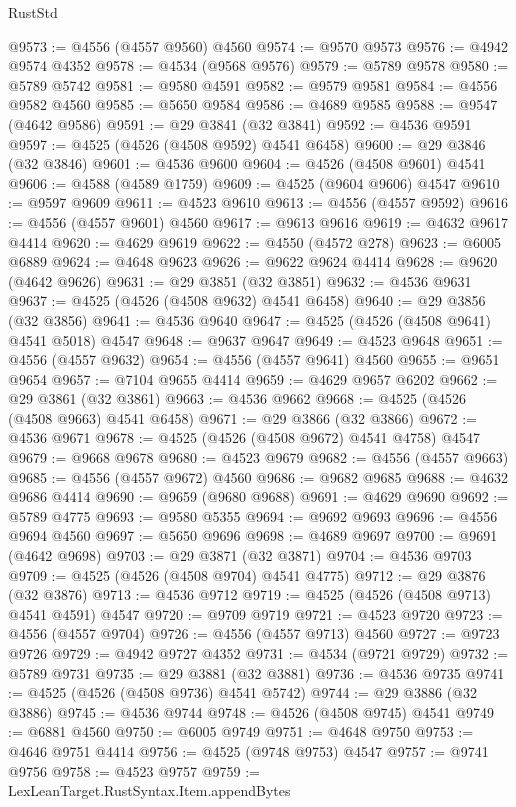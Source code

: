 \begin{lexlean}{RustStd}
\begin{coremodule}
{\begin{coremodule}
{{{{{{{{{{{{{{{{{{{{{{{{{{{{{{{{{{{{{{{{{{{{{{{{{{{{{{{@9573 := @4556 (@4557 @9560) @4560
@9574 := @9570 @9573
@9576 := @4942 @9574 @4352
@9578 := @4534 (@9568 @9576)
@9579 := @5789 @9578
@9580 := @5789 @5742
@9581 := @9580 @4591
@9582 := @9579 @9581
@9584 := @4556 @9582 @4560
@9585 := @5650 @9584
@9586 := @4689 @9585
@9588 := @9547 (@4642 @9586)
@9591 := @29 @3841 (@32 @3841)
@9592 := @4536 @9591
@9597 := @4525 (@4526 (@4508 @9592) @4541 @6458)
@9600 := @29 @3846 (@32 @3846)
@9601 := @4536 @9600
@9604 := @4526 (@4508 @9601) @4541
@9606 := @4588 (@4589 @1759)
@9609 := @4525 (@9604 @9606) @4547
@9610 := @9597 @9609
@9611 := @4523 @9610
@9613 := @4556 (@4557 @9592)
@9616 := @4556 (@4557 @9601) @4560
@9617 := @9613 @9616
@9619 := @4632 @9617 @4414
@9620 := @4629 @9619
@9622 := @4550 (@4572 @278)
@9623 := @6005 @6889
@9624 := @4648 @9623
@9626 := @9622 @9624 @4414
@9628 := @9620 (@4642 @9626)
@9631 := @29 @3851 (@32 @3851)
@9632 := @4536 @9631
@9637 := @4525 (@4526 (@4508 @9632) @4541 @6458)
@9640 := @29 @3856 (@32 @3856)
@9641 := @4536 @9640
@9647 := @4525 (@4526 (@4508 @9641) @4541 @5018) @4547
@9648 := @9637 @9647
@9649 := @4523 @9648
@9651 := @4556 (@4557 @9632)
@9654 := @4556 (@4557 @9641) @4560
@9655 := @9651 @9654
@9657 := @7104 @9655 @4414
@9659 := @4629 @9657 @6202
@9662 := @29 @3861 (@32 @3861)
@9663 := @4536 @9662
@9668 := @4525 (@4526 (@4508 @9663) @4541 @6458)
@9671 := @29 @3866 (@32 @3866)
@9672 := @4536 @9671
@9678 := @4525 (@4526 (@4508 @9672) @4541 @4758) @4547
@9679 := @9668 @9678
@9680 := @4523 @9679
@9682 := @4556 (@4557 @9663)
@9685 := @4556 (@4557 @9672) @4560
@9686 := @9682 @9685
@9688 := @4632 @9686 @4414
@9690 := @9659 (@9680 @9688)
@9691 := @4629 @9690
@9692 := @5789 @4775
@9693 := @9580 @5355
@9694 := @9692 @9693
@9696 := @4556 @9694 @4560
@9697 := @5650 @9696
@9698 := @4689 @9697
@9700 := @9691 (@4642 @9698)
@9703 := @29 @3871 (@32 @3871)
@9704 := @4536 @9703
@9709 := @4525 (@4526 (@4508 @9704) @4541 @4775)
@9712 := @29 @3876 (@32 @3876)
@9713 := @4536 @9712
@9719 := @4525 (@4526 (@4508 @9713) @4541 @4591) @4547
@9720 := @9709 @9719
@9721 := @4523 @9720
@9723 := @4556 (@4557 @9704)
@9726 := @4556 (@4557 @9713) @4560
@9727 := @9723 @9726
@9729 := @4942 @9727 @4352
@9731 := @4534 (@9721 @9729)
@9732 := @5789 @9731
@9735 := @29 @3881 (@32 @3881)
@9736 := @4536 @9735
@9741 := @4525 (@4526 (@4508 @9736) @4541 @5742)
@9744 := @29 @3886 (@32 @3886)
@9745 := @4536 @9744
@9748 := @4526 (@4508 @9745) @4541
@9749 := @6881 @4560
@9750 := @6005 @9749
@9751 := @4648 @9750
@9753 := @4646 @9751 @4414
@9756 := @4525 (@9748 @9753) @4547
@9757 := @9741 @9756
@9758 := @4523 @9757
@9759 := LexLeanTarget.RustSyntax.Item.appendBytes
}}}}}}}}}}}}}}}}}}}}}}}}}}}}}}}}}}}}}}}}}}}}}}}}}}}}}}}
\end{coremodule}}
\end{coremodule}
\end{lexlean}
